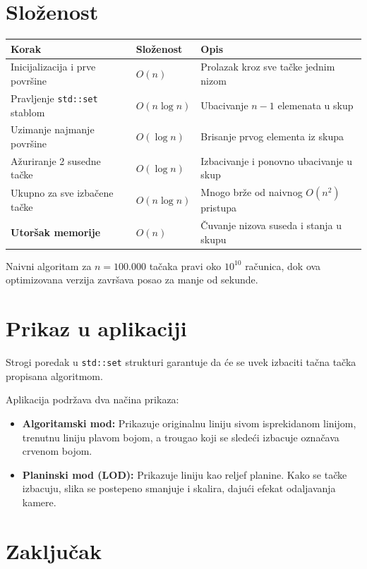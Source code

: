 \documentclass[11pt]{article}
\theoremstyle{definition}
\begin{document}
\section{Složenost}

\begin{center}
\begin{tabular}{@{}lll@{}}
\toprule
\textbf{Korak} & \textbf{Složenost} & \textbf{Opis} \\
\midrule
Inicijalizacija i prve površine & $O(n)$ & Prolazak kroz sve tačke jednim nizom \\
Pravljenje \texttt{std::set} stablom & $O(n \log n)$ & Ubacivanje $n-1$ elemenata u skup \\
Uzimanje najmanje površine & $O(\log n)$ & Brisanje prvog elementa iz skupa \\
Ažuriranje 2 susedne tačke & $O(\log n)$ & Izbacivanje i ponovno ubacivanje u skup \\
Ukupno za sve izbačene tačke & $O(n \log n)$ & Mnogo brže od naivnog $O(n^2)$ pristupa \\
\midrule
\textbf{Utoršak memorije} & $O(n)$ & Čuvanje nizova suseda i stanja u skupu \\
\bottomrule
\end{tabular}
\end{center}

Naivni algoritam za $n = 100.000$ tačaka pravi oko $10^{10}$ računica, dok ova optimizovana verzija završava posao za manje od sekunde.

\section{Prikaz u aplikaciji}

Strogi poredak u \texttt{std::set} strukturi garantuje da će se uvek izbaciti tačna tačka propisana algoritmom.

Aplikacija podržava dva načina prikaza:
\begin{itemize}[leftmargin=*]
    \item \textbf{Algoritamski mod:} Prikazuje originalnu liniju sivom isprekidanom linijom, trenutnu liniju plavom bojom, a trougao koji se sledeći izbacuje označava crvenom bojom.
    \item \textbf{Planinski mod (LOD):} Prikazuje liniju kao reljef planine. Kako se tačke izbacuju, slika se postepeno smanjuje i skalira, dajući efekat odaljavanja kamere.
\end{itemize}

\section{Zaključak}
\end{document}
